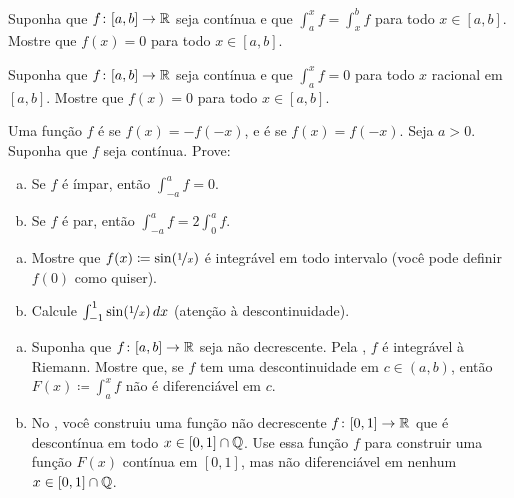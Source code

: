 \begin{exercise}
Suponha que $f \colon [a,b] \to {\mathbb{R}}$ seja contínua e que
$\int_a^x f = \int_x^b f$ para todo $x \in [a,b]$. Mostre que $f(x) = 0$
para todo $x \in [a,b]$.
\end{exercise}

\begin{exercise}
Suponha que $f \colon [a,b] \to {\mathbb{R}}$ seja contínua e que
$\int_a^x f = 0$ para todo $x$ racional em $[a,b]$. Mostre que $f(x) = 0$
para todo $x \in [a,b]$.
\end{exercise}

\begin{samepage}
\begin{exercise}
Uma função $f$ é \emph{} se $f(x) = -f(-x)$,
e é \emph{} se $f(x) = f(-x)$. Seja $a >
0$. Suponha que $f$ seja contínua. Prove:
\begin{enumerate}[a)]
\item
Se $f$ é ímpar, então $\int_{-a}^a f = 0$.
\item
Se $f$ é par, então $\int_{-a}^a f = 2 \int_0^a f$.
\end{enumerate}
\end{exercise}
\end{samepage}

\begin{exercise}
\leavevmode
\begin{enumerate}[a)]
\item
Mostre que $f(x) \coloneqq \sin(\nicefrac{1}{x})$
é integrável em todo intervalo (você pode definir $f(0)$ como quiser).
\item
Calcule $\int_{-1}^1 \sin(\nicefrac{1}{x})\,dx$ (atenção à
descontinuidade).
\end{enumerate}
\end{exercise}

\begin{exercise}
\leavevmode
\begin{enumerate}[a)]
\item
Suponha que $f \colon [a,b] \to {\mathbb{R}}$ seja não decrescente.
Pela ,
$f$ é integrável à Riemann. Mostre que, se $f$ tem uma descontinuidade em
$c \in (a,b)$, então $F(x) \coloneqq \int_a^x f$ não é diferenciável em $c$.
\item
No , você construiu uma função
não decrescente $f \colon [0,1] \to {\mathbb{R}}$ que é descontínua em todo
$x \in [0,1] \cap {\mathbb{Q}}$. Use essa função $f$ para construir uma função $F(x)$
contínua em $[0,1]$, mas não diferenciável em nenhum $x \in [0,1] \cap {\mathbb{Q}}$.
\end{enumerate}
\end{exercise}


